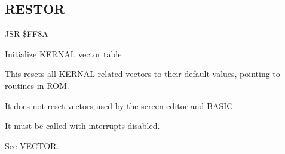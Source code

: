 
\newpage
\subsection{RESTOR}
\label{KERNAL Jump Table!RESTOR}
\begin{description}[leftmargin=2cm,style=nextline]
    \item [Address:] JSR \$FF8A
    \item [Description:] Initialize KERNAL vector table
    \item [Remarks:]
        This resets all KERNAL-related vectors to their default values, pointing to routines in ROM.

        It does not reset vectors used by the screen editor and BASIC.

        It must be called with interrupts disabled.

        See VECTOR.
    \item [Example:]
\end{description}



\newpage

